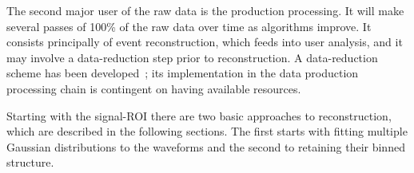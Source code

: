The second major user of the raw data is the production processing.
It will make several passes of 100\% of the raw data over time as
algorithms improve.  It consists principally of 
event reconstruction, which feeds into user analysis, and 
it may involve a data-reduction step prior to reconstruction.
A data-reduction scheme has been developed~\cite{qian-viren-reduc}; its implementation in the data production
processing chain is contingent on having available resources.


Starting with the signal-ROI there are two basic approaches to
reconstruction, which are described in the following
sections.  The first starts with fitting multiple Gaussian
distributions to the waveforms and the second to retaining their
binned structure.

